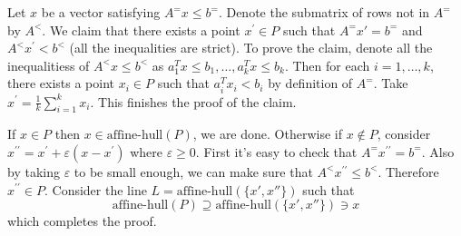 \documentclass[11pt]{article}
\renewcommand{\leq}{\leqslant}
\renewcommand{\geq}{\geqslant}
\begin{document}
\begin{enumerate}[1)]
\begin{solution}
\begin{enumerate}
Let  $x$ be a vector satisfying $ A^= x \leq b^=$. 
Denote the submatrix of rows not in $A^=$ by $A^<$. 
We claim that there exists a point $x^\prime \in P$ such that $A^= x' = b^=$ and $A^< x^\prime < b^<$ (all the inequalities are strict). To prove the claim, denote all the inequalitiess of $A^< x\leq b^<$ as $a_1^T x \leq b_1, \dots, a_k^T x \leq b_k$. Then for each $i = 1, \dots, k$, there exists a point $x_i \in P$ such that $a_i^T x_i < b_i$ by definition of $A^=$. 
Take $x^\prime = \frac{1}{k} \sum_{i=1}^k x_i$. This finishes the proof of the claim.


If $x \in P$ then $x \in \text{affine-hull}(P)$, we are done. 
Otherwise if $x \notin P$, consider $x^{\prime\prime} = x^\prime + \varepsilon(x-x^\prime)$ where $\varepsilon\geq 0$. 
First it's easy to check that $A^= x^{\prime\prime} = b^=$.
Also by taking $\varepsilon$ to be small enough, we can make sure that $A^< x^{\prime\prime} \leq b^<$. Therefore $x^{\prime\prime} \in P$.
Consider the line $L = \text{affine-hull}(\{x', x''\})$ such that $$\text{affine-hull}(P) \supseteq \text{affine-hull}(\{x', x''\}) \ni x$$
which completes the proof.
\end{enumerate}

\end{solution}


\end{enumerate}



  
\end{document}
